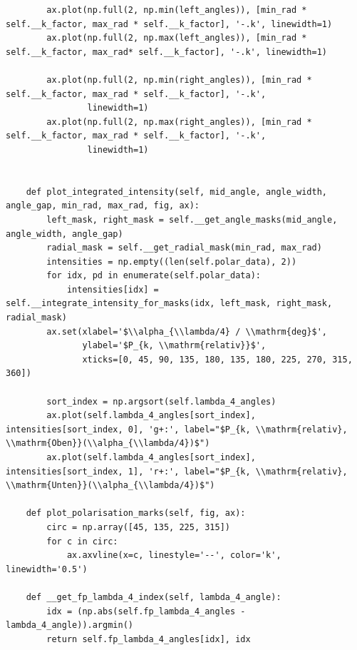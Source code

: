 \documentclass[a4paper, titlepage,  ngerman]{book}
\begin{document}
\begin{verbatim}
        ax.plot(np.full(2, np.min(left_angles)), [min_rad * self.__k_factor, max_rad * self.__k_factor], '-.k', linewidth=1)
        ax.plot(np.full(2, np.max(left_angles)), [min_rad * self.__k_factor, max_rad* self.__k_factor], '-.k', linewidth=1)

        ax.plot(np.full(2, np.min(right_angles)), [min_rad * self.__k_factor, max_rad * self.__k_factor], '-.k',
                linewidth=1)
        ax.plot(np.full(2, np.max(right_angles)), [min_rad * self.__k_factor, max_rad * self.__k_factor], '-.k',
                linewidth=1)


    def plot_integrated_intensity(self, mid_angle, angle_width, angle_gap, min_rad, max_rad, fig, ax):
        left_mask, right_mask = self.__get_angle_masks(mid_angle, angle_width, angle_gap)
        radial_mask = self.__get_radial_mask(min_rad, max_rad)
        intensities = np.empty((len(self.polar_data), 2))
        for idx, pd in enumerate(self.polar_data):
            intensities[idx] = self.__integrate_intensity_for_masks(idx, left_mask, right_mask, radial_mask)
        ax.set(xlabel='$\\alpha_{\\lambda/4} / \\mathrm{deg}$',
               ylabel='$P_{k, \\mathrm{relativ}}$',
               xticks=[0, 45, 90, 135, 180, 135, 180, 225, 270, 315, 360])

        sort_index = np.argsort(self.lambda_4_angles)
        ax.plot(self.lambda_4_angles[sort_index], intensities[sort_index, 0], 'g+:', label="$P_{k, \\mathrm{relativ}, \\mathrm{Oben}}(\\alpha_{\\lambda/4})$")
        ax.plot(self.lambda_4_angles[sort_index], intensities[sort_index, 1], 'r+:', label="$P_{k, \\mathrm{relativ}, \\mathrm{Unten}}(\\alpha_{\\lambda/4})$")

    def plot_polarisation_marks(self, fig, ax):
        circ = np.array([45, 135, 225, 315])
        for c in circ:
            ax.axvline(x=c, linestyle='--', color='k', linewidth='0.5')

    def __get_fp_lambda_4_index(self, lambda_4_angle):
        idx = (np.abs(self.fp_lambda_4_angles - lambda_4_angle)).argmin()
        return self.fp_lambda_4_angles[idx], idx


\end{verbatim}
\end{document}
